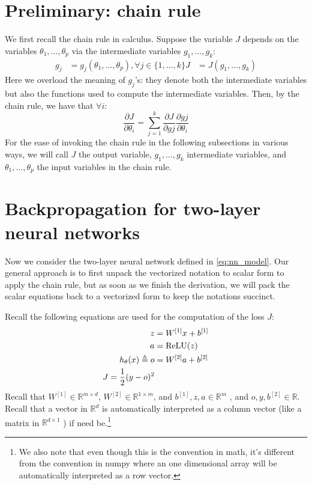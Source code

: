 \section{Preliminary: chain rule}
We first recall the chain rule in calculus. Suppose the variable $J$ depends on
the variables $\theta_{1},\ldots,\theta_p$ via the intermediate variables $g_1,\ldots,g_k$:
\begin{align}
    g_j &= g_j (\theta_{1} ,\ldots,\theta_p ),\forall j \in \{1, \ldots ,k\}
    J &= J(g_1,\ldots,g_k)
\end{align}
Here we overload the meaning of $g_j$'s: they denote both the intermediate
variables but also the functions used to compute the intermediate variables.
Then, by the chain rule, we have that $\forall i$:
\begin{equation}
    \frac{\partial J}{\partial \theta_i} = \sum_{j=1}^k \frac{\partial J}{\partial g j}\frac{\partial g j}{\partial \theta_i}\label{eq:chain_rule}
\end{equation}
For the ease of invoking the chain rule in the following subsections in various
ways, we will call $J$ the output variable, $g_1 ,\ldots,g_k$ intermediate variables,
and $\theta_{1} ,\ldots,\theta_p$ the input variables in the chain rule.

\section{Backpropagation for two-layer neural networks}
Now we consider the two-layer neural network defined in \cref{eq:nn_model}.
Our general approach is to first unpack the vectorized notation to scalar
form to apply the chain rule, but as soon as we finish the derivation, we will
pack the scalar equations back to a vectorized form to keep the notations
succinct.

Recall the following equations are used for the computation of the loss $J$:
\begin{align}
    z &= W^{[1]}x + b^{[1]}\\
    a &= \operatorname{ReLU}(z)\\
    h_\theta(x) \triangleq o &= W^{[2]}a + b^{[2]}\\
    J = \frac{1}{2} (y - o)^2
\end{align}
Recall that $W^{[1]} \in \mathbb{R}^{m \times d}$, $W^{[2]} \in \mathbb{R}^{1 \times m}$, and $b^{[1]},z,a \in \mathbb{R}^m$ , and $o,y,b^{[2]} \in \mathbb{R}$.
Recall that a vector in $\mathbb R^d$ is automatically interpreted as a column vector
(like a matrix in $\mathbb R^{d \times 1}$ ) if need be.\footnote{
We also note that even though this is the convention in math, it's different from the
convention in numpy where an one dimensional array will be automatically interpreted as
a row vector.}


